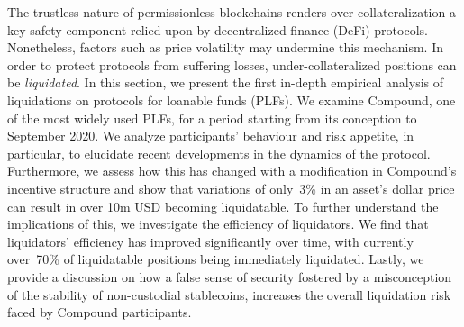 The trustless nature of permissionless blockchains renders over-collateralization a key safety component relied upon by decentralized finance (DeFi) protocols.
Nonetheless, factors such as price volatility may undermine this mechanism. 
In order to protect protocols from suffering losses, under-collateralized positions can be \textit{liquidated}.
In this section, we present the first in-depth empirical analysis of liquidations on protocols for loanable funds (PLFs).
We examine Compound, one of the most widely used PLFs, for a period starting from its conception to September 2020.
We analyze participants' behaviour and risk appetite, in particular, to elucidate recent developments in the dynamics of the protocol.
Furthermore, we assess how this has changed with a modification in Compound's incentive structure and show that variations of only~3\% in an asset's dollar price can result in over 10m USD becoming liquidatable.
To further understand the implications of this, we investigate the efficiency of liquidators.
We find that liquidators' efficiency has improved significantly over time, with currently over~70\% of liquidatable positions being immediately liquidated.
Lastly, we provide a discussion on how a false sense of security fostered by a misconception of the stability of non-custodial stablecoins, increases the overall liquidation risk faced by Compound participants.
